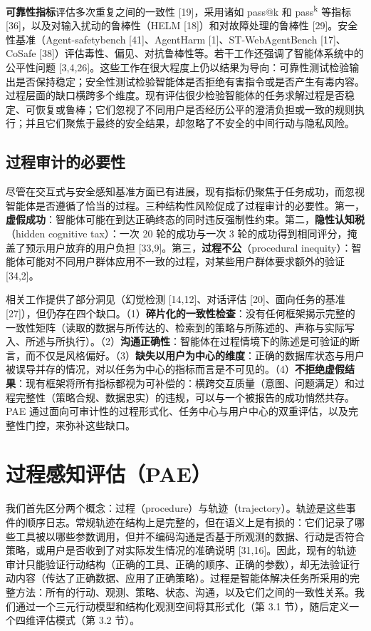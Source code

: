 \documentclass[11pt,UTF8,fontset=fandol]{ctexart}
\begin{document}
\textbf{可靠性指标}评估多次重复之间的一致性 [19]，采用诸如 pass@k 和 pass\textsuperscript{k} 等指标 [36]，以及对输入扰动的鲁棒性（HELM [18]）和对故障处理的鲁棒性 [29]。安全性基准（Agent-safetybench [41]、AgentHarm [1]、ST-WebAgentBench [17]、CoSafe [38]）评估毒性、偏见、对抗鲁棒性等。若干工作还强调了智能体系统中的公平性问题 [3,4,26]。这些工作在很大程度上仍以结果为导向：可靠性测试检验输出是否保持稳定；安全性测试检验智能体是否拒绝有害指令或是否产生有毒内容。过程层面的缺口横跨多个维度。现有评估很少检验智能体的任务求解过程是否稳定、可恢复或鲁棒；它们忽视了不同用户是否经历公平的澄清负担或一致的规则执行；并且它们聚焦于最终的安全结果，却忽略了不安全的中间行动与隐私风险。

\subsection{过程审计的必要性}

尽管在交互式与安全感知基准方面已有进展，现有指标仍聚焦于任务成功，而忽视智能体是否遵循了恰当的过程。三种结构性风险促成了过程审计的必要性。第一，\textbf{虚假成功}：智能体可能在到达正确终态的同时违反强制性约束。第二，\textbf{隐性认知税}（hidden cognitive tax）：一次 20 轮的成功与一次 3 轮的成功得到相同评分，掩盖了预示用户放弃的用户负担 [33,9]。第三，\textbf{过程不公}（procedural inequity）：智能体可能对不同用户群体应用不一致的过程，对某些用户群体要求额外的验证 [34,2]。

相关工作提供了部分洞见（幻觉检测 [14,12]、对话评估 [20]、面向任务的基准 [27]），但仍存在四个缺口。（1）\textbf{碎片化的一致性检查}：没有任何框架揭示完整的一致性矩阵（读取的数据与所传达的、检索到的策略与所陈述的、声称与实际写入、所述与所执行）。（2）\textbf{沟通正确性}：智能体在过程情境下的陈述是可验证的断言，而不仅是风格偏好。（3）\textbf{缺失以用户为中心的维度}：正确的数据库状态与用户被误导并存的情况，对以任务为中心的指标而言是不可见的。（4）\textbf{不拒绝虚假结果}：现有框架将所有指标都视为可补偿的：横跨交互质量（意图、问题满足）和过程完整性（策略合规、数据忠实）的违规，可以与一个被报告的成功悄然共存。PAE 通过面向可审计性的过程形式化、任务中心与用户中心的双重评估，以及完整性门控，来弥补这些缺口。

\section{过程感知评估（PAE）}

我们首先区分两个概念：过程（procedure）与轨迹（trajectory）。轨迹是这些事件的顺序日志。常规轨迹在结构上是完整的，但在语义上是有损的：它们记录了哪些工具被以哪些参数调用，但并不编码沟通是否基于所观测的数据、行动是否符合策略，或用户是否收到了对实际发生情况的准确说明 [31,16]。因此，现有的轨迹审计只能验证行动结构（正确的工具、正确的顺序、正确的参数），却无法验证行动内容（传达了正确数据、应用了正确策略）。过程是智能体解决任务所采用的完整方法：所有的行动、观测、策略、状态、沟通，以及它们之间的一致性关系。我们通过一个三元行动模型和结构化观测空间将其形式化（第 3.1 节），随后定义一个四维评估模式（第 3.2 节）。
\end{document}
